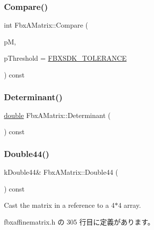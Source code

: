 \subsubsection{\texorpdfstring{Compare()}{Compare()}}
{\footnotesize\ttfamily int Fbx\+A\+Matrix\+::\+Compare (\begin{DoxyParamCaption}\item[{const \hyperlink{class_fbx_a_matrix}{Fbx\+A\+Matrix}}]{pM,  }\item[{const \hyperlink{class_fbx_a_matrix_ad463edbb9fea344643297701f159faa7}{double}}]{p\+Threshold = {\ttfamily \hyperlink{fbxtypes_8h_acf3cd6f208edb42ad9c9abbc1f7feea0}{F\+B\+X\+S\+D\+K\+\_\+\+T\+O\+L\+E\+R\+A\+N\+CE}} }\end{DoxyParamCaption}) const}

\mbox{\label{class_fbx_a_matrix_a4aa7cbe3d389f1d2cbdfbbf2de032192}} 
\subsubsection{\texorpdfstring{Determinant()}{Determinant()}}
{\footnotesize\ttfamily \hyperlink{class_fbx_a_matrix_ad463edbb9fea344643297701f159faa7}{double} Fbx\+A\+Matrix\+::\+Determinant (\begin{DoxyParamCaption}{ }\end{DoxyParamCaption}) const}

\mbox{\label{class_fbx_a_matrix_ab98e9bd947f8db20e14aa9b1d124402a}} 
\subsubsection{\texorpdfstring{Double44()}{Double44()}}
{\footnotesize\ttfamily k\+Double44\& Fbx\+A\+Matrix\+::\+Double44 (\begin{DoxyParamCaption}{ }\end{DoxyParamCaption}) const\hspace{0.3cm}{\ttfamily [inline]}}



Cast the matrix in a reference to a 4$\ast$4 array. 



 fbxaffinematrix.\+h の 305 行目に定義があります。

